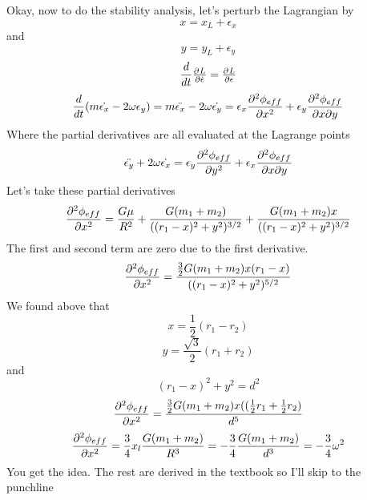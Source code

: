 Okay, now to do the stability analysis, let's perturb the Lagrangian by 
\begin{equation}
x = x_L + \epsilon_x
\end{equation}
and
\begin{equation}
y = y_L + \epsilon_y
\end{equation}
\begin{equation}
\d{}{t} \pd{L}{\dot{\epsilon}} = \pd{L}{\epsilon}
\end{equation}
\begin{equation}
\frac{d }{d t} ( m\dot{\epsilon_x} - 2\omega \epsilon_y) = m\ddot{\epsilon_x} - 2\omega \dot{\epsilon_y} =  \epsilon_x \frac{\partial^2 \phi_{eff}}{\partial x^2} + \epsilon_y \frac{\partial^2 \phi_{eff}}{\partial x\partial y}
\end{equation}
Where the partial derivatives are all evaluated at the Lagrange points
\begin{equation}
\ddot{\epsilon_y} + 2\omega\dot{\epsilon_x} = \epsilon_y \frac{\partial^2 \phi_{eff}}{\partial y^2} + \epsilon_x \frac{\partial^2 \phi_{eff}}{\partial x\partial y} 
\end{equation}
Let's take these partial derivatives
\begin{equation}
\frac{\partial^2 \phi_{eff}}{\partial x^2} = \frac{G\mu}{R^2} + \frac{G(m_1 + m_2)}{((r_1 - x)^2 + y^2)^{3/2}} + \frac{G(m_1 + m_2)x}{((r_1 - x)^2 + y^2)^{3/2}}
\end{equation}
The first and second term are zero due to the first derivative. 
\begin{equation}
\frac{\partial^2 \phi_{eff}}{\partial x^2} = \frac{\frac{3}{2}G(m_1 + m_2)x(r_1 - x)}{((r_1 - x)^2 + y^2)^{5/2}}
\end{equation}
We found above that
\begin{equation}
x = \frac{1}{2}(r_1 - r_2)
\end{equation}
\begin{equation}
y = \frac{\sqrt{3}}{2} (r_1 + r_2)
\end{equation}
and 
\begin{equation}
(r_1 - x)^2 + y^2 = d^2
\end{equation}
\begin{equation}
\frac{\partial^2 \phi_{eff}}{\partial x^2} = \frac{\frac{3}{2}G(m_1 + m_2)x((\frac{1}{2}r_1 + \frac{1}{2}r_2)}{d^5}
\end{equation}
\begin{equation}
\frac{\partial^2 \phi_{eff}}{\partial x^2} = \frac{3}{4} x_l\frac{G(m_1 + m_2)}{R^3}= -\frac{3}{4} \frac{G(m_1 + m_2)}{d^3} = -\frac{3}{4} \omega^2
\end{equation}
You get the idea. The rest are derived in the textbook so I'll skip to the punchline
